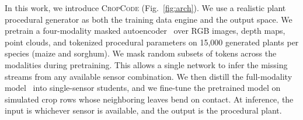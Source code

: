 \documentclass[10pt,twocolumn,letterpaper]{article}
\newcommand{\method}{\textsc{CropCode}}
\begin{document}
In this work, we introduce \method{} (Fig.~\ref{fig:arch}). We use a realistic plant procedural generator as both the training data engine and the output space. We pretrain a four-modality masked autoencoder~\citep{he2022mae,bachmann2022multimae,mizrahi2023fourm,dong2025embodiedmae} over RGB images, depth maps, point clouds, and tokenized procedural parameters on 15{,}000 generated plants per species (maize and sorghum). We mask random subsets of tokens across the modalities during pretraining. This allows a single network to infer the missing streams from any available sensor combination. We then distill the full-modality model~\citep{hinton2015distillation} into single-sensor students, and we fine-tune the pretrained model on simulated crop rows whose neighboring leaves bend on contact. At inference, the input is whichever sensor is available, and the output is the procedural plant.
\end{document}
